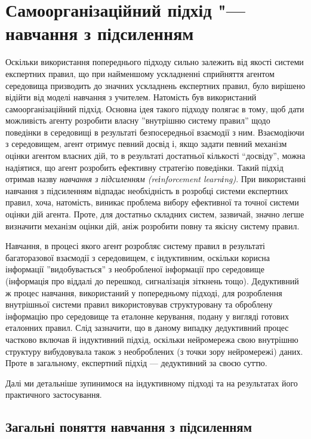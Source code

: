 \documentclass[a4paper,10pt,fleqn]{article}
\begin{document}
\section{Самоорганізаційний підхід "--- навчання з підсиленням}

Оскільки використання попереднього підходу сильно залежить від якості системи експертних правил, що при найменшому ускладненні сприйняття агентом середовища призводить до значних ускладнень експертних правил, було вирішено відійти від моделі навчання з учителем. Натомість був використаний самоорганізаційний підхід. Основна ідея такого підходу полягає в тому, щоб дати можливість агенту розробити власну ''внутрішню систему правил'' щодо поведінки в середовищі в результаті безпосередньої взаємодії з ним. Взаємодіючи з середовищем, агент отримує певний досвід і, якщо задати певний механізм оцінки агентом власних дій, то в результаті достатньої кількості ``досвіду'', можна надіятися, що агент розробить ефективну стратегію поведінки. Такий підхід отримав назву \emph{навчання з підсиленням (reіnforcement learnіng)}. При використанні навчання з підсиленням відпадає необхідність в розробці системи експертних правил, хоча, натомість, виникає проблема вибору ефективної та точної системи оцінки дій агента. Проте, для достатньо складних систем, зазвичай, значно легше визначити механізм оцінки дій, аніж розробити повну та якісну систему правил.

Навчання, в процесі якого агент розробляє систему правил в результаті багаторазової взаємодії з середовищем, є індуктивним, оскільки корисна інформації ''видобувається'' з необробленої інформації про середовище (інформація про віддалі до перешкод, сигналізація зіткнень тощо). Дедуктивний ж процес навчання, використаний у попередньому підході, для розроблення внутрішньої системи правил використовував структуровану та оброблену інформацію про середовище та еталонне керування, подану у вигляді готових еталонних правил. Слід зазначити, що в даному випадку дедуктивний процес частково включав й індуктивний підхід, оскільки нейромережа свою внутрішню структуру вибудовувала також з необроблених (з точки зору нейромережі) даних. Проте в загальному, експертний підхід --- дедуктивний за своєю суттю. 

Далі ми детальніше зупинимося на індуктивному підході та на результатах його практичного застосування.

\subsection{Загальні поняття навчання з підсиленням}
\end{document}
